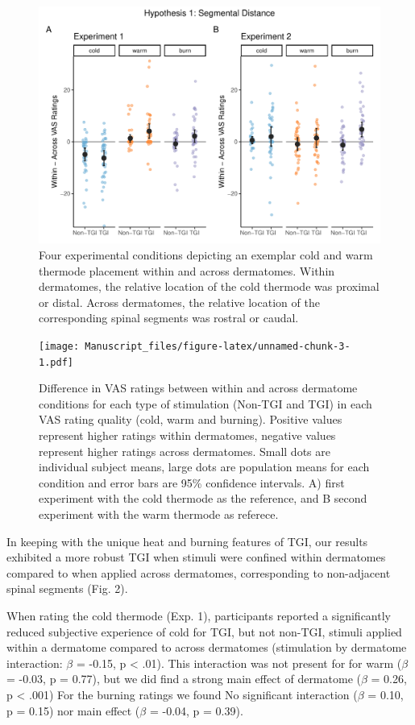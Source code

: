 \documentclass[
]{article}
\begin{document}
\begin{figure}
\centering
\includegraphics{Manuscript_files/figure-latex/unnamed-chunk-2-1.pdf}
\caption{Four experimental conditions depicting an exemplar cold and
warm thermode placement within and across dermatomes. Within dermatomes,
the relative location of the cold thermode was proximal or distal.
Across dermatomes, the relative location of the corresponding spinal
segments was rostral or caudal.}
\end{figure}

\begin{figure}
\centering
\texttt{[image: Manuscript\_files/figure-latex/unnamed-chunk-3-1.pdf]}
\caption{Difference in VAS ratings between within and across dermatome
conditions for each type of stimulation (Non-TGI and TGI) in each VAS
rating quality (cold, warm and burning). Positive values represent
higher ratings within dermatomes, negative values represent higher
ratings across dermatomes. Small dots are individual subject means,
large dots are population means for each condition and error bars are
95\% confidence intervals. A) first experiment with the cold thermode as
the reference, and B second experiment with the warm thermode as
referece.}
\end{figure}

In keeping with the unique heat and burning features of TGI, our results
exhibited a more robust TGI when stimuli were confined within dermatomes
compared to when applied across dermatomes, corresponding to
non-adjacent spinal segments (Fig. 2).

When rating the cold thermode (Exp. 1), participants reported a
significantly reduced subjective experience of cold for TGI, but not
non-TGI, stimuli applied within a dermatome compared to across
dermatomes (stimulation by dermatome interaction: \(\beta\) = -0.15, p
\textless{} .01). This interaction was not present for for warm
(\(\beta\) = -0.03, p = 0.77), but we did find a strong main effect of
dermatome (\(\beta\) = 0.26, p \textless{} .001) For the burning ratings
we found No significant interaction (\(\beta\) = 0.10, p = 0.15) nor
main effect (\(\beta\) = -0.04, p = 0.39).
\end{document}
